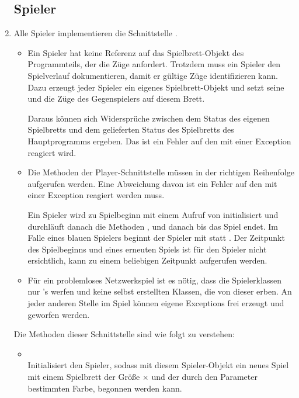 \begin{enumerate}
\subsection*{Spieler}

\item Alle Spieler implementieren die Schnittstelle .

\begin{itemize}
\item Ein Spieler hat keine Referenz auf das Spielbrett-Objekt des Programmteils, der die Züge anfordert. Trotzdem muss ein Spieler den Spielverlauf dokumentieren, damit er gültige Züge identifizieren kann. Dazu erzeugt jeder Spieler ein eigenes Spielbrett-Objekt und setzt seine und die Züge des Gegenspielers auf diesem Brett.

Daraus können sich Widersprüche zwischen dem Status des eigenen Spielbretts und dem gelieferten Status des Spielbretts des Hauptprogramms ergeben. Das ist ein Fehler auf den mit einer Exception reagiert wird.

\item Die Methoden der Player-Schnittstelle müssen in der richtigen Reihenfolge aufgerufen werden. Eine Abweichung davon ist ein Fehler auf den mit einer Exception reagiert werden muss.

Ein Spieler wird zu Spielbeginn mit einem Aufruf von  initialisiert und durchläuft danach die Methoden ,  und danach  bis das Spiel endet. Im Falle eines blauen Spielers beginnt der Spieler mit  statt . Der Zeitpunkt des Spielbeginns und eines erneuten Spiels ist für den Spieler nicht ersichtlich,  kann zu einem beliebigen Zeitpunkt aufgerufen werden.

\newpage
\item Für ein problemloses Netzwerkspiel ist es nötig, dass die Spielerklassen nur 's werfen und keine selbst erstellten Klassen, die von dieser erben. An jeder anderen Stelle im Spiel können eigene Exceptions frei erzeugt und geworfen werden.
\end{itemize}

Die Methoden dieser Schnittstelle sind wie folgt zu verstehen:

\begin{itemize}[leftmargin=4em]
\item[\code{init}] \hfill \\Initialisiert den Spieler, sodass mit diesem Spieler-Objekt ein neues Spiel mit einem Spielbrett der Größe  $\times$  und der durch den Parameter  bestimmten Farbe, begonnen werden kann.


\end{itemize}
\end{enumerate}

